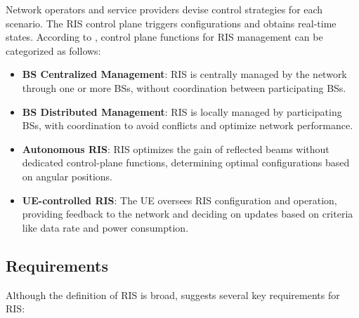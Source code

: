 \documentclass[lettersize,journal]{IEEEtran}
\begin{document}
Network operators and service providers devise control strategies for each scenario. The RIS control plane triggers configurations and obtains real-time states. According to \cite{ETSI-GR-RIS-001}, control plane functions for RIS management can be categorized as follows:
\begin{itemize}
\item \textbf{BS Centralized Management}: RIS is centrally managed by the network through one or more BSs, without coordination between participating BSs.

\item \textbf{BS Distributed Management}: RIS is locally managed by participating BSs, with coordination to avoid conflicts and optimize network performance.

\item \textbf{Autonomous RIS}: RIS optimizes the gain of reflected beams without dedicated control-plane functions, determining optimal configurations based on angular positions.

\item \textbf{UE-controlled RIS}: The UE oversees RIS configuration and operation, providing feedback to the network and deciding on updates based on criteria like data rate and power consumption.
\end{itemize}

\subsection{Requirements}

Although the definition of RIS is broad, \cite{ETSI-GR-RIS-001} suggests several key requirements for RIS:
\end{document}
